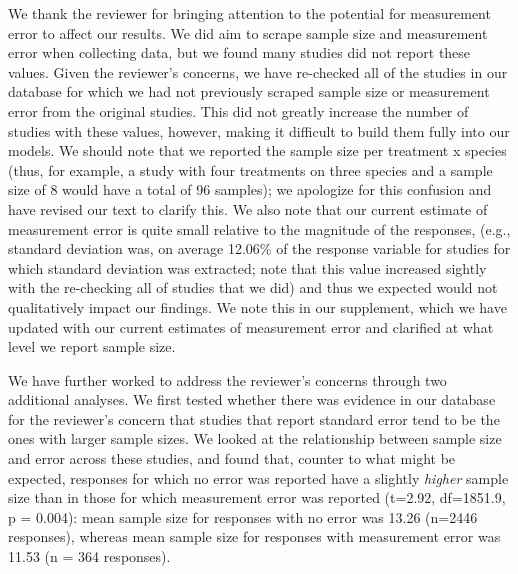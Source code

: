 \documentclass{article}
\begin{document}
{%
We thank the reviewer for bringing attention to the potential for measurement error to affect our results. We did aim to scrape sample size and measurement error when collecting data, but we found many studies did not report these values. Given the reviewer's concerns, we have re-checked all of the studies in our database for which we had not previously scraped sample size or measurement error from the original studies. This did not greatly increase the number of studies with these values, however, making it difficult to build them fully into our models. We should note that we reported the sample size per treatment x species (thus, for example, a study with four treatments on three species and a sample size of 8 would have a total of 96 samples); we apologize for this confusion and have revised our text to clarify this. We also note that our current estimate of measurement error is quite small relative to the magnitude of the responses, (e.g., standard deviation was, on average 12.06\% of the response variable for studies for which standard deviation was extracted; note that this value increased sightly with the re-checking all of studies that we did) and thus we expected would not qualitatively impact our findings. We note this in our supplement, which we have updated with our current estimates of measurement error and clarified at what level we report sample size. 

We have further worked to address the reviewer's concerns through two additional analyses. We first tested whether there was evidence in our database for the reviewer's concern that studies that report standard error tend to be the ones with larger sample sizes. We looked at the relationship between sample size and error across these studies, and found that, counter to what might be expected, responses for which no error was reported have a slightly \emph{higher} sample size than in those for which measurement error was reported (t=2.92, df=1851.9, p = 0.004): mean sample size for responses with no error was 13.26 (n=2446 responses), whereas mean sample size for responses with measurement error was 11.53 (n = 364 responses).

}
\end{document}
